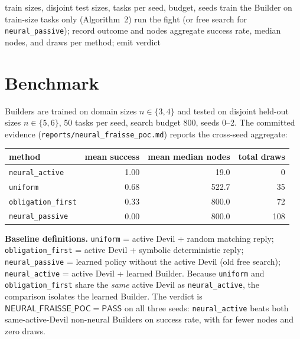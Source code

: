 \documentclass[11pt]{article}
\begin{document}
\begin{algorithm}[h]
\caption{Benchmark evaluation}
\begin{algorithmic}[1]
\Require train sizes, disjoint test sizes, tasks per seed, budget, seeds
\State train the Builder on train-size tasks only (Algorithm~2)
  \State run the fight (or free search for \texttt{neural\_passive}); record outcome and nodes
\EndFor
\State aggregate success rate, median nodes, and draws per method; emit verdict
\end{algorithmic}
\end{algorithm}

\section{Benchmark}\label{sec:nf-bench}

Builders are trained on domain sizes \(n\in\{3,4\}\) and tested on disjoint held-out sizes \(n\in\{5,6\}\), 50 tasks per seed, search budget 800, seeds 0--2.  The committed evidence (\texttt{reports/neural\_fraisse\_poc.md}) reports the cross-seed aggregate:

\begin{center}
\begin{tabular}{lrrr}
\toprule
method & mean success & mean median nodes & total draws \\
\midrule
\texttt{neural\_active}    & 1.00 & 19.0 & 0 \\
\texttt{uniform}           & 0.68 & 522.7 & 35 \\
\texttt{obligation\_first} & 0.33 & 800.0 & 72 \\
\texttt{neural\_passive}   & 0.00 & 800.0 & 108 \\
\bottomrule
\end{tabular}
\end{center}

\noindent\textbf{Baseline definitions.}
\texttt{uniform} = active Devil + random matching reply;
\texttt{obligation\_first} = active Devil + symbolic deterministic reply;
\texttt{neural\_passive} = learned policy without the active Devil (old free search);
\texttt{neural\_active} = active Devil + learned Builder.
Because \texttt{uniform} and \texttt{obligation\_first} share the \emph{same} active Devil as \texttt{neural\_active}, the comparison isolates the learned Builder.  The verdict is \(\mathsf{NEURAL\_FRAISSE\_POC}=\mathsf{PASS}\) on all three seeds: \texttt{neural\_active} beats both same-active-Devil non-neural Builders on success rate, with far fewer nodes and zero draws.
\end{document}
